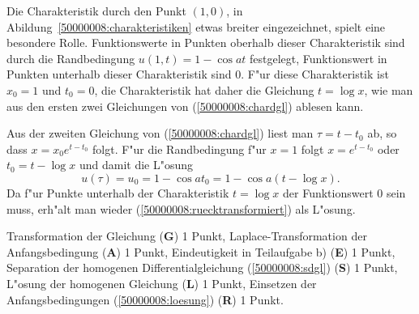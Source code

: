 \begin{diskussion}
Die Charakteristik durch den Punkt $(1,0)$, in Abildung~\ref{50000008:charakteristiken} etwas breiter eingezeichnet, spielt eine besondere Rolle.
Funktionswerte in Punkten oberhalb dieser Charakteristik sind durch die 
Randbedingung $u(1,t)=1-\cos at$ festgelegt, Funktionswert in Punkten
unterhalb dieser Charakteristik sind $0$.
F"ur diese Charakteristik ist $x_0=1$ und $t_0=0$, die Charakteristik
hat daher die Gleichung $t=\log x$, wie man aus den ersten zwei Gleichungen
von (\ref{50000008:chardgl}) ablesen kann.

Aus der zweiten Gleichung von (\ref{50000008:chardgl})
liest man $\tau=t-t_0$ ab, so dass 
$x=x_0e^{t-t_0}$ folgt.
F"ur die Randbedingung f"ur $x=1$ folgt $x=e^{t-t_0}$
oder $t_0=t-\log x$ und damit die L"osung 
\[
u(\tau)=u_0=1-\cos at_0=1-\cos a(t-\log x).
\]
Da f"ur Punkte unterhalb der Charakteristik $t=\log x$ der Funktionswert $0$
sein muss, erh"alt man wieder (\ref{50000008:ruecktransformiert}) als L"osung.
\end{diskussion}

\begin{bewertung}
Transformation der Gleichung ({\bf G}) 1 Punkt,
Laplace-Transformation der Anfangsbedingung ({\bf A}) 1 Punkt,
Eindeutigkeit in Teilaufgabe b) ({\bf E}) 1 Punkt,
Separation der homogenen Differentialgleichung (\ref{50000008:sdgl})
({\bf S}) 1 Punkt,
L"osung der homogenen Gleichung ({\bf L}) 1 Punkt,
Einsetzen der Anfangsbedingungen (\ref{50000008:loesung}) ({\bf R}) 1 Punkt.
\end{bewertung}
